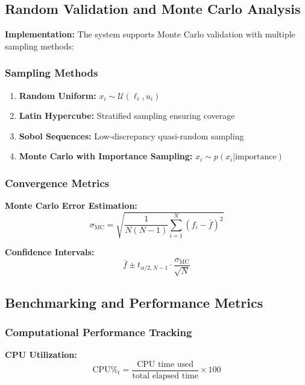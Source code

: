 \documentclass[12pt,a4paper]{article}
\begin{document}
\subsection{Random Validation and Monte Carlo Analysis}
\textbf{Implementation:}
The system supports Monte Carlo validation with multiple sampling methods:

\subsubsection{Sampling Methods}
\begin{enumerate}
\item \textbf{Random Uniform:} $x_i \sim \mathcal{U}(\ell_i, u_i)$
\item \textbf{Latin Hypercube:} Stratified sampling ensuring coverage
\item \textbf{Sobol Sequences:} Low-discrepancy quasi-random sampling
\item \textbf{Monte Carlo with Importance Sampling:} $x_i \sim p(x_i | \text{importance})$
\end{enumerate}

\subsubsection{Convergence Metrics}
\textbf{Monte Carlo Error Estimation:}
\begin{equation}
\sigma_{\text{MC}} = \sqrt{\frac{1}{N(N-1)} \sum_{i=1}^N (f_i - \bar{f})^2} \label{eq:monte_carlo_error}
\end{equation}

\textbf{Confidence Intervals:}
\begin{equation}
\bar{f} \pm t_{\alpha/2, N-1} \cdot \frac{\sigma_{\text{MC}}}{\sqrt{N}} \label{eq:confidence_intervals}
\end{equation}

\subsection{Benchmarking and Performance Metrics}
\subsubsection{Computational Performance Tracking}
\textbf{CPU Utilization:}
\begin{equation}
\text{CPU\%}_t = \frac{\text{CPU time used}}{\text{total elapsed time}} \times 100 \label{eq:cpu_utilization}
\end{equation}
\end{document}
